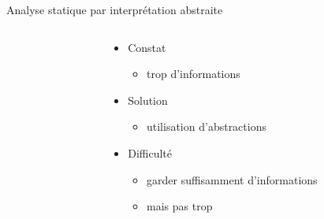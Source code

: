 \documentclass[xcolor={dvipsnames}]{beamer}
\begin{document}
\begin{frame}{Analyse statique par interprétation abstraite}
\begin{columns}
\begin{column}{0.3\textwidth}
\begin{center}
      \end{center}
    \end{column}
    \begin{column}{0.5\textwidth}
      \begin{block}{}
        \begin{itemize}
        \item Constat
          \begin{itemize}
          \item trop d'informations
          \end{itemize}
        \item Solution
          \begin{itemize}
          \item utilisation d'abstractions
          \end{itemize}
        \item Difficulté
          \begin{itemize}
          \item garder suffisamment d'informations
          \item mais pas trop
          \end{itemize}
        \end{itemize}
      \end{block}
    \end{column}
  \end{columns}
\end{frame}
\end{document}
